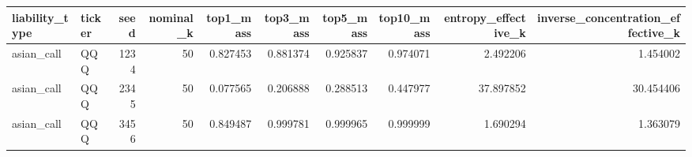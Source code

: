 \begin{tabular}{llrrrrrrrr}
\toprule
liability\_type & ticker & seed & nominal\_k & top1\_mass & top3\_mass & top5\_mass & top10\_mass & entropy\_effective\_k & inverse\_concentration\_effective\_k \\
\midrule
asian\_call & QQQ & 1234 & 50 & 0.827453 & 0.881374 & 0.925837 & 0.974071 & 2.492206 & 1.454002 \\
asian\_call & QQQ & 2345 & 50 & 0.077565 & 0.206888 & 0.288513 & 0.447977 & 37.897852 & 30.454406 \\
asian\_call & QQQ & 3456 & 50 & 0.849487 & 0.999781 & 0.999965 & 0.999999 & 1.690294 & 1.363079 \\
\bottomrule
\end{tabular}
